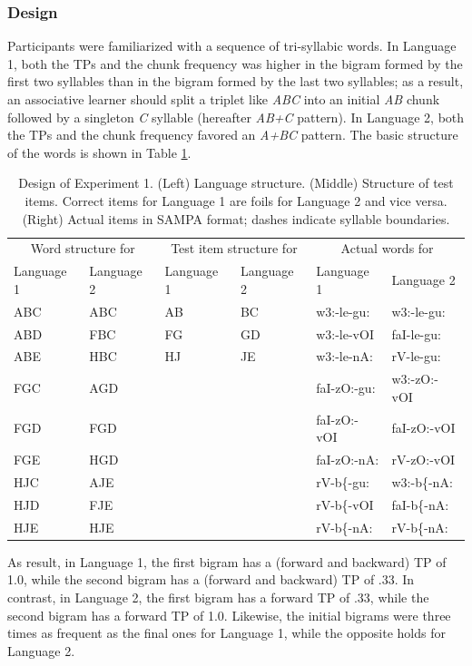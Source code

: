 \documentclass[]{article}
\begin{document}
\subsubsection{Design}

Participants were familiarized with a sequence of tri-syllabic words. In Language 1, both the TPs and the chunk frequency was higher in the bigram formed by the first two syllables than in the bigram formed by the last two syllables; as a result, an associative learner should split a triplet like \emph{ABC} into an initial \emph{AB} chunk followed by a singleton \emph{C} syllable (hereafter \emph{AB+C} pattern). In Language 2, both the TPs and the chunk frequency favored an \emph{A+BC} pattern. The basic structure of the words is shown in Table \ref{tab:stats-london-print-language-structure}.

\begin{table}[hbp]

\caption{\label{tab:stats-london-print-language-structure}Design of Experiment 1. (Left) Language structure. (Middle) Structure of test items. Correct items for Language 1 are foils for Language 2 and vice versa. (Right) Actual items in SAMPA format; dashes indicate syllable boundaries.}
\centering
\begin{tabular}[t]{llllll}
\toprule
\multicolumn{2}{c}{Word structure for} & \multicolumn{2}{c}{Test item structure for} & \multicolumn{2}{c}{Actual words for} \\
Language 1 & Language 2 & Language 1 & Language 2 & Language 1 & Language 2\\
\midrule
ABC & ABC & AB & BC & w3:-le-gu: & w3:-le-gu:\\
ABD & FBC & FG & GD & w3:-le-vOI & faI-le-gu:\\
ABE & HBC & HJ & JE & w3:-le-nA: & rV-le-gu:\\
FGC & AGD &  &  & faI-zO:-gu: & w3:-zO:-vOI\\
FGD & FGD &  &  & faI-zO:-vOI & faI-zO:-vOI\\
\addlinespace
FGE & HGD &  &  & faI-zO:-nA: & rV-zO:-vOI\\
HJC & AJE &  &  & rV-b\{-gu: & w3:-b\{-nA:\\
HJD & FJE &  &  & rV-b\{-vOI & faI-b\{-nA:\\
HJE & HJE &  &  & rV-b\{-nA: & rV-b\{-nA:\\
\bottomrule
\end{tabular}
\end{table}

As result, in Language 1, the first bigram has a (forward and backward) TP of 1.0, while the second bigram has a (forward and backward) TP of .33. In contrast, in Language 2, the first bigram has a forward TP of .33, while the second bigram has a forward TP of 1.0. Likewise, the initial bigrams were three times as frequent as the final ones for Language 1, while the opposite holds for Language 2.
\end{document}

